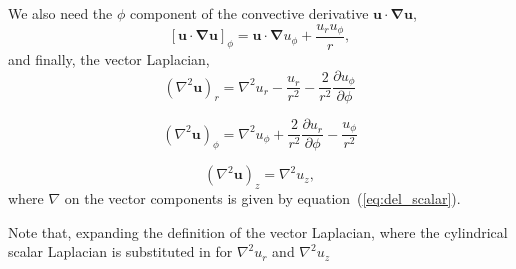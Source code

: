 \documentclass{paper}
\newcommand{\uphi}{\ensuremath{u_\phi}}
\begin{document}
We also need the $\phi$ component of the convective derivative $\mathbf{u \cdot \nabla u}$,
\begin{equation}
  \label{eq:convective_deriv_phi}
  \left[\mathbf{u \cdot \nabla u} \right]_\phi = \mathbf{u \cdot \nabla} \uphi + \frac{ u_r \uphi}{r},
\end{equation}
and finally, the vector Laplacian,
\begin{equation}
  \label{eq:vec_lap_r}
  (\nabla^2 \mathbf{u})_r = \nabla^2 u_r - \frac{u_r}{r^2} - \frac{2}{r^2} \frac{\partial \uphi}{\partial \phi}
\end{equation}

\begin{equation}
  \label{eq:vec_lap_phi}
  (\nabla^2 \mathbf{u})_\phi = \nabla^2 u_\phi + \frac{2}{r^2} \frac{\partial u_r}{\partial \phi} - \frac{u_\phi}{r^2} 
\end{equation}

\begin{equation}
  \label{eq:vec_lap_z}
  (\nabla^2 \mathbf{u})_z = \nabla^2 u_z,
\end{equation}
where $\nabla$ on the vector components is given by equation~(\ref{eq:del_scalar}).

Note that, expanding the definition of the vector Laplacian, where the cylindrical scalar Laplacian is substituted in for $\nabla^2 u_r$ and $\nabla^2 u_z$  
\end{document}
